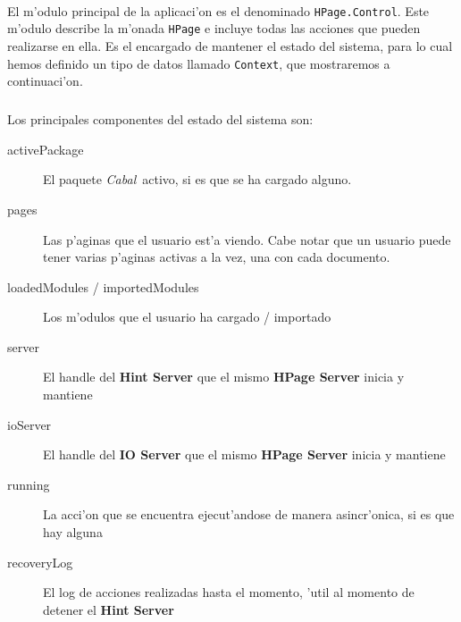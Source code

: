 \documentclass[a4paper]{article}
\newcommand{\cabal}{\textsl{Cabal}}
\begin{document}
\paragraph{}El m'odulo principal de la aplicaci'on es el denominado \texttt{HPage.Control}.  Este m'odulo describe la m'onada \texttt{HPage} e incluye todas las acciones que pueden realizarse en ella.  Es el encargado de mantener el estado del sistema, para lo cual hemos definido un tipo de datos llamado \texttt{Context}, que mostraremos a continuaci'on.
\subparagraph{} Los principales componentes del estado del sistema son:
\begin{description}
	\item[activePackage] El paquete \cabal\ activo, si es que se ha cargado alguno.
	\item[pages] Las p'aginas que el usuario est'a viendo.  Cabe notar que un usuario puede tener varias p'aginas activas a la vez, una con cada documento.
	\item[loadedModules / importedModules] Los m'odulos que el usuario ha cargado / importado
	\item[server] El handle del \textbf{Hint Server} que el mismo \textbf{HPage Server} inicia y mantiene
	\item[ioServer] El handle del \textbf{IO Server} que el mismo \textbf{HPage Server} inicia y mantiene
	\item[running] La acci'on que se encuentra ejecut'andose de manera asincr'onica, si es que hay alguna
	\item[recoveryLog] El log de acciones realizadas hasta el momento, 'util al momento de detener el \textbf{Hint Server}
\end{description}
\end{document}
